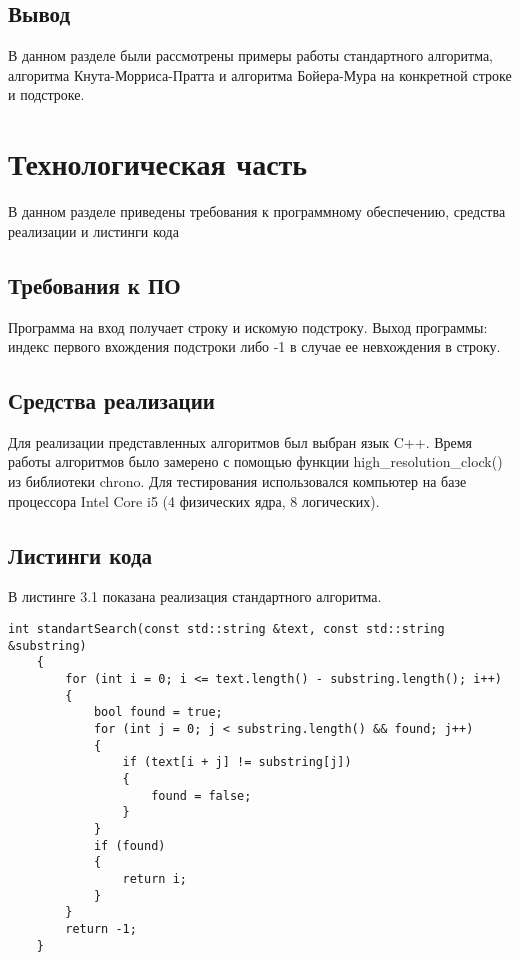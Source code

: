 \documentclass[a4paper,12pt]{report}
\begin{document}
\section*{Вывод}
\hspace{0.6cm}В данном разделе были рассмотрены примеры работы стандартного алгоритма, алгоритма Кнута-Морриса-Пратта и  алгоритма Бойера-Мура на конкретной строке и подстроке.

\chapter{Технологическая часть}
\hspace{0.6cm}В данном разделе приведены требования к программному обеспечению, средства реализации и листинги кода
\section{Требования к ПО}

\hspace{0.6cm}Программа на вход получает строку и искомую подстроку. Выход  программы: индекс первого вхождения подстроки либо -1 в случае ее невхождения в строку.
	
\section{Средства реализации}
\hspace{0.6cm}Для реализации представленных алгоритмов был выбран язык C++. Время работы алгоритмов было замерено с помощью функции high\_resolution\_clock() из библиотеки chrono. Для тестирования использовался компьютер на базе процессора Intel Core i5 (4 физических ядра, 8 логических).

\section{Листинги кода}

В листинге 3.1 показана реализация стандартного алгоритма.

\begin{lstlisting}[caption=Функция стандартного алгоритма]
    int standartSearch(const std::string &text, const std::string &substring)
    {
        for (int i = 0; i <= text.length() - substring.length(); i++)
        {
            bool found = true;
            for (int j = 0; j < substring.length() && found; j++)
            {
                if (text[i + j] != substring[j])
                {
                    found = false;
                }
            }
            if (found)
            {
                return i;
            }
        }
        return -1;
    }
\end{lstlisting}
\end{document}
